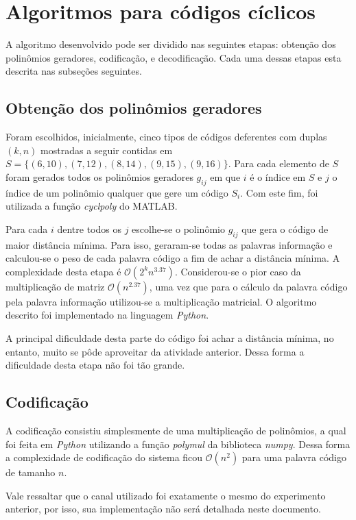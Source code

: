 \section{Algoritmos para códigos cíclicos}
A algoritmo desenvolvido pode ser dividido nas seguintes etapas: obtenção dos polinômios geradores, codificação, e decodificação. Cada uma dessas etapas esta descrita nas subseções seguintes.

\subsection{Obtenção dos polinômios geradores}
Foram escolhidos, inicialmente, cinco tipos de códigos deferentes com duplas $(k, n)$ mostradas a seguir contidas em $S = \{(6, 10), (7, 12), (8, 14), (9, 15), (9, 16)\}$. Para cada elemento de $S$ foram gerados todos os polinômios geradores $g_{ij}$ em que $i$ é o índice em $S$ e $j$ o índice de um polinômio qualquer que gere um código $S_i$. Com este fim, foi utilizada a função \textit{cyclpoly} do MATLAB.

Para cada $i$ dentre todos os $j$ escolhe-se o polinômio $g_{ij}$ que gera o código de maior distância mínima. Para isso, geraram-se todas as palavras informação e calculou-se o peso de cada palavra código a fim de achar a distância mínima. A complexidade desta etapa é $\mathcal{O}(2^kn^{3.37})$. Considerou-se o pior caso da multiplicação de matriz $\mathcal{O}(n^{2.37})$, uma vez que para o cálculo da palavra código pela palavra informação utilizou-se a multiplicação matricial. O algoritmo descrito foi implementado na linguagem \textit{Python}.

A principal dificuldade desta parte do código foi achar a distância mínima, no entanto, muito se pôde aproveitar da atividade anterior. Dessa forma a dificuldade desta etapa não foi tão grande.

\subsection{Codificação}

A codificação consistiu simplesmente de uma multiplicação de polinômios, a qual foi feita em \textit{Python} utilizando a função \textit{polymul} da biblioteca \textit{numpy}. Dessa forma a complexidade de codificação do sistema ficou $\mathcal{O}(n^2)$ para uma palavra código de tamanho $n$.

Vale ressaltar que o canal utilizado foi exatamente o mesmo do experimento anterior, por isso, sua implementação não será detalhada neste documento.

